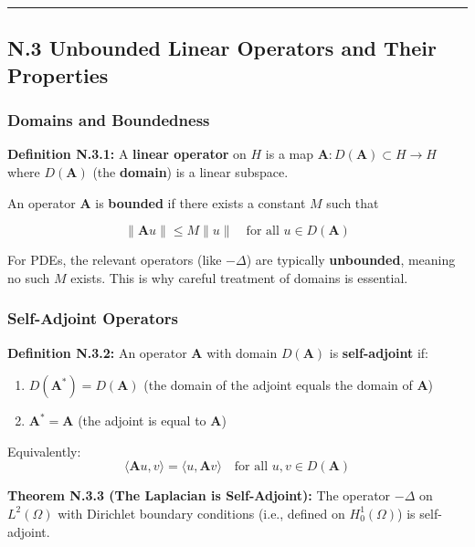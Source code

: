 \documentclass[
]{article}
\providecommand{\tightlist}{%
  \setlength{\itemsep}{0pt}\setlength{\parskip}{0pt}}
\begin{document}
\begin{center}\rule{0.5\linewidth}{0.5pt}\end{center}

\subsection{N.3 Unbounded Linear Operators and Their
Properties}\label{n.3-unbounded-linear-operators-and-their-properties}

\subsubsection{Domains and Boundedness}\label{domains-and-boundedness}

\textbf{Definition N.3.1:} A \textbf{linear operator} on \(H\) is a map
\(\mathbf{A}: D(\mathbf{A}) \subset H \to H\) where \(D(\mathbf{A})\)
(the \textbf{domain}) is a linear subspace.

An operator \(\mathbf{A}\) is \textbf{bounded} if there exists a
constant \(M\) such that

\[\|\mathbf{A}u\| \leq M\|u\| \quad \text{for all } u \in D(\mathbf{A})\]

For PDEs, the relevant operators (like \(-\Delta\)) are typically
\textbf{unbounded}, meaning no such \(M\) exists. This is why careful
treatment of domains is essential.

\subsubsection{Self-Adjoint Operators}\label{self-adjoint-operators}

\textbf{Definition N.3.2:} An operator \(\mathbf{A}\) with domain
\(D(\mathbf{A})\) is \textbf{self-adjoint} if:

\begin{enumerate}
\def\labelenumi{\arabic{enumi}.}
\tightlist
\item
  \(D(\mathbf{A}^*) = D(\mathbf{A})\) (the domain of the adjoint equals
  the domain of \(\mathbf{A}\))
\item
  \(\mathbf{A}^* = \mathbf{A}\) (the adjoint is equal to \(\mathbf{A}\))
\end{enumerate}

Equivalently:
\[\langle \mathbf{A}u, v \rangle = \langle u, \mathbf{A}v \rangle \quad \text{for all } u, v \in D(\mathbf{A})\]

\textbf{Theorem N.3.3 (The Laplacian is Self-Adjoint):} The operator
\(-\Delta\) on \(L^2(\Omega)\) with Dirichlet boundary conditions (i.e.,
defined on \(H^1_0(\Omega)\)) is self-adjoint.
\end{document}
